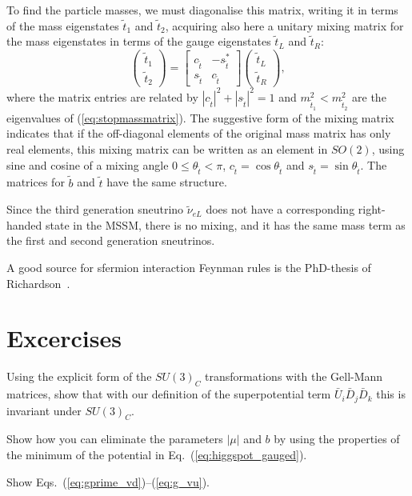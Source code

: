 \documentclass[notes.tex]{subfiles}
\begin{document}
To find the particle masses, we must diagonalise this matrix, writing it in terms of the mass eigenstates $\tilde{t}_1$ and $\tilde{t}_2$,  acquiring also here  a unitary mixing matrix for the mass eigenstates in terms of the gauge eigenstates $\tilde{t}_L$ and $\tilde{t}_R$:
\begin{equation}
\begin{pmatrix}\tilde{t}_1\\ \tilde{t}_2\end{pmatrix} 
=\begin{bmatrix}c_{\tilde t} & -s_{\tilde t}^* \\ s_{\tilde t} & c_{\tilde t} \end{bmatrix}
\begin{pmatrix}\tilde{t}_L\\ \tilde{t}_R\end{pmatrix},
\end{equation}
where the matrix entries are related by $|c_{\tilde t} |^2+|s_{\tilde t} |^2=1$ and  $m_{\tilde t_1}^2<m_{\tilde t_2}^2$ are the eigenvalues of (\ref{eq:stopmassmatrix}). The suggestive form of the mixing matrix indicates that if the off-diagonal elements of the original mass matrix has only real elements, this mixing matrix can be written as an element in $SO(2)$, using sine and cosine of a mixing angle $0\le\theta_{\tilde t}<\pi$,  $c_{\tilde t}=\cos\theta_{\tilde t}$ and $s_{\tilde t}=\sin\theta_{\tilde t}$.
The matrices for $\tilde{b}$ and $\tilde{t}$ have the same structure. 

Since the third generation sneutrino $\tilde\nu_{eL}$ does not have a corresponding right-handed state in the MSSM, there is no mixing, and it has the same mass term as the first and second generation sneutrinos.

A good source for sfermion interaction Feynman rules is the PhD-thesis of Richardson~\cite{Richardson:2000nt}.



\section{Excercises}

\begin{Exercise}[]
Using the explicit form of the $SU(3)_C$ transformations with the Gell-Mann matrices, show that with our definition of the superpotential term $\bar{U}_i\bar{D}_j\bar{D}_k$ this is invariant under $SU(3)_C$.
\end{Exercise}


\begin{Exercise}[]
Show how you can eliminate the parameters $|\mu|$ and $b$ by using the properties of the minimum of the potential in Eq.~(\ref{eq:higgspot_gauged}).
\end{Exercise}

\begin{Exercise}[]
Show Eqs.~(\ref{eq:gprime_vd})--(\ref{eq:g_vu}).
\end{Exercise}
\end{document}
